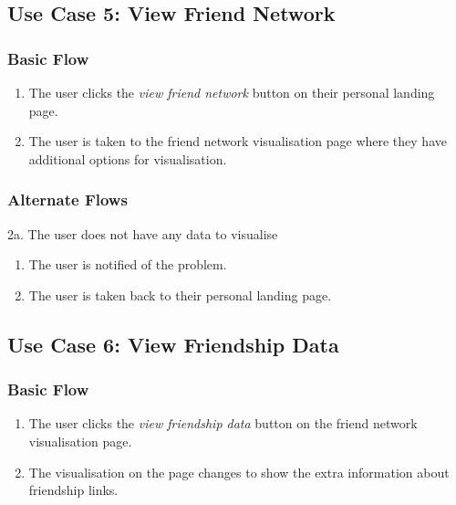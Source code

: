 \documentclass[12pt,onecolumn]{article}
\begin{document}
	\subsection{Use Case 5: View Friend Network}

		\subsubsection{Basic Flow}

		\begin{enumerate}
			\item The user clicks the \emph{view friend network} button on their personal landing page.

			\item The user is taken to the friend network visualisation page where they have additional options for visualisation. 	

		\end{enumerate}

		\subsubsection{Alternate Flows}

		2a. The user does not have any data to visualise

		\begin{enumerate}
			\item The user is notified of the problem.

			\item The user is taken back to their personal landing page.

		\end{enumerate}

	\subsection{Use Case 6: View Friendship Data}

		\subsubsection{Basic Flow}

		\begin{enumerate}
			\item The user clicks the \emph{view friendship data} button on the friend network visualisation page.

			\item The visualisation on the page changes to show the extra information about friendship links. 	

		\end{enumerate}
\end{document}
